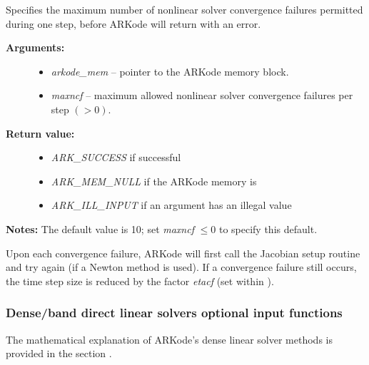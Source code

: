 \documentclass[letterpaper,10pt,english]{sphinxmanual}
\begin{document}
\begin{fulllineitems}
\label{c_interface/User_callable:c.ARKodeSetMaxConvFails}
Specifies the maximum number of nonlinear solver
convergence failures permitted during one step, before ARKode will
return with an error.
\begin{description}
\item[{\textbf{Arguments:}}] \leavevmode\begin{itemize}
\item {} 
\emph{arkode\_mem} -- pointer to the ARKode memory block.

\item {} 
\emph{maxncf} -- maximum allowed nonlinear solver convergence failures
per step \((>0)\).

\end{itemize}

\item[{\textbf{Return value:}}] \leavevmode\begin{itemize}
\item {} 
\emph{ARK\_SUCCESS} if successful

\item {} 
\emph{ARK\_MEM\_NULL} if the ARKode memory is 

\item {} 
\emph{ARK\_ILL\_INPUT} if an argument has an illegal value

\end{itemize}

\end{description}

\textbf{Notes:} The default value is 10; set \emph{maxncf} \(\le 0\)
to specify this default.

Upon each convergence failure, ARKode will first call the Jacobian
setup routine and try again (if a Newton method is used).  If a
convergence failure still occurs, the time step size is reduced by
the factor \emph{etacf} (set within {\hyperref[c_interface/User_callable:c.ARKodeSetMaxCFailGrowth]{\emph{}}}).

\end{fulllineitems}



\subsubsection{Dense/band direct linear solvers optional input functions}
\label{c_interface/User_callable:cinterface-arkdlsinputs}\label{c_interface/User_callable:dense-band-direct-linear-solvers-optional-input-functions}
The mathematical explanation of ARKode's dense linear solver methods
is provided in the section {\hyperref[Mathematics:mathematics-linear]{\emph{}}}.
\end{document}
